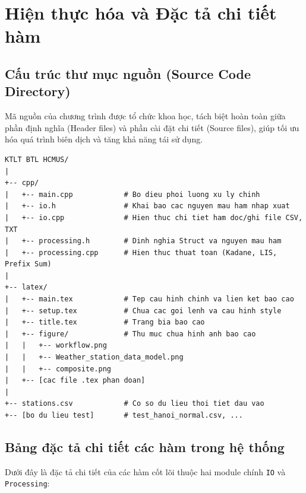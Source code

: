 \section{Hiện thực hóa và Đặc tả chi tiết hàm}

\subsection{Cấu trúc thư mục nguồn (Source Code Directory)}
Mã nguồn của chương trình được tổ chức khoa học, tách biệt hoàn toàn giữa phần định nghĩa (Header files) và phần cài đặt chi tiết (Source files), giúp tối ưu hóa quá trình biên dịch và tăng khả năng tái sử dụng.
\begin{verbatim}
KTLT BTL HCMUS/
|
+-- cpp/
|   +-- main.cpp            # Bo dieu phoi luong xu ly chinh
|   +-- io.h                # Khai bao cac nguyen mau ham nhap xuat
|   +-- io.cpp              # Hien thuc chi tiet ham doc/ghi file CSV, TXT
|   +-- processing.h        # Dinh nghia Struct va nguyen mau ham
|   +-- processing.cpp      # Hien thuc thuat toan (Kadane, LIS, Prefix Sum)
|
+-- latex/
|   +-- main.tex            # Tep cau hinh chinh va lien ket bao cao
|   +-- setup.tex           # Chua cac goi lenh va cau hinh style
|   +-- title.tex           # Trang bia bao cao
|   +-- figure/             # Thu muc chua hinh anh bao cao
|   |   +-- workflow.png
|   |   +-- Weather_station_data_model.png
|   |   +-- composite.png
|   +-- [cac file .tex phan doan]
|
+-- stations.csv            # Co so du lieu thoi tiet dau vao
+-- [bo du lieu test]       # test_hanoi_normal.csv, ...
\end{verbatim}

\subsection{Bảng đặc tả chi tiết các hàm trong hệ thống}
Dưới đây là đặc tả chi tiết của các hàm cốt lõi thuộc hai module chính \texttt{IO} và \texttt{Processing}:

